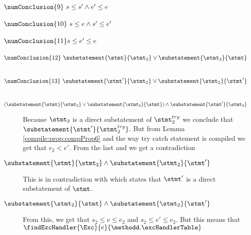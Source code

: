 $\numConclusion{9} \ s \le s' \wedge e' \le e  $ \\
 \\
$\numConclusion{10} \ s \le  e  \wedge s' \le  e'  $ \\
 \\
$  \numConclusion{11}   s  \le  e' \le  e  $\\
 \\
$  \numConclusion{12} \    \substatement{\stmt}{\stmt_2} \vee \substatement{\stmt_2}{\stmt}  $

 \\
$  \numConclusion{13} \    \substatement{\stmt'}{\stmt_2} \vee \substatement{\stmt_2}{\stmt'}  $\\
\\ 

\begin{description}
  \item[$( \substatement{\stmt}{\stmt_2} \vee \substatement{\stmt_2}{\stmt} ) \wedge \substatement{\stmt'}{\stmt_2}   $] 
   Because $ \stmt_2$ is a direct substatement of $\stmt^{try}_2$ we conclude that    $\substatement{\stmt'}{ \stmt^{try}_2  }$.
    But from Lemma \ref{compile:prop:compProp6} and the way try catch statement is compiled
    we get that $e_2 <  e'$. From the last and  we get  a contradiction

     \item[$ \substatement{\stmt}{\stmt_2}  \wedge \substatement{\stmt_2} {\stmt'}  $] 
     This is in contradiction with   which states that $\stmt'$ is a direct substatement 
     of  $\stmt$.

      \item[$ \substatement{\stmt_2}{\stmt}  \wedge \substatement{\stmt_2} {\stmt'}  $] 
      From this, we get that $s_2 \le e \le e_2$ and $s_2 \le e' \le e_2 $.
      But this means that $\findExcHandler{\Exc}{e}{\methodd.\excHandlerTable} $
\end{description}



